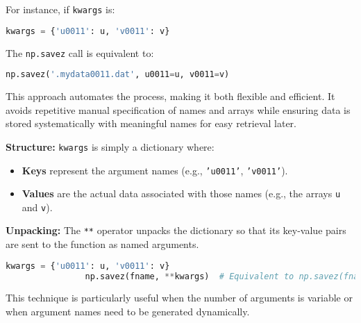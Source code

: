 \documentclass{article}
\begin{document}
			For instance, if \texttt{kwargs} is:
			\begin{lstlisting}[language=Python]
				kwargs = {'u0011': u, 'v0011': v}
			\end{lstlisting}
			The \texttt{np.savez} call is equivalent to:
			\begin{lstlisting}[language=Python]
				np.savez('.mydata0011.dat', u0011=u, v0011=v)
			\end{lstlisting}
			
			This approach automates the process, making it both flexible and efficient. It avoids repetitive manual specification of names and arrays while ensuring data is stored systematically with meaningful names for easy retrieval later.
			
			\begin{comment}
			
			\paragraph{What is \texttt{kwargs}?}
			The term \texttt{kwargs} stands for keyword arguments. In Python, a function can accept an arbitrary number of keyword arguments using the \texttt{**kwargs} syntax. This allows flexibility when the exact number or names of arguments are not known in advance.
				content...
			\end{comment}
			
			\textbf{Structure:} \texttt{kwargs} is simply a dictionary where:
			\begin{itemize}
				\item \textbf{Keys} represent the argument names (e.g., \texttt{'u0011'}, \texttt{'v0011'}).
				\item \textbf{Values} are the actual data associated with those names (e.g., the arrays \texttt{u} and \texttt{v}).
			\end{itemize}
			
			\textbf{Unpacking:} The \texttt{**} operator unpacks the dictionary so that its key-value pairs are sent to the function as named arguments.
			
			\begin{lstlisting}[language=Python]
				kwargs = {'u0011': u, 'v0011': v}
				np.savez(fname, **kwargs)  # Equivalent to np.savez(fname, u0011=u, v0011=v)
			\end{lstlisting}
			
			This technique is particularly useful when the number of arguments is variable or when argument names need to be generated dynamically.
			
\end{document}
